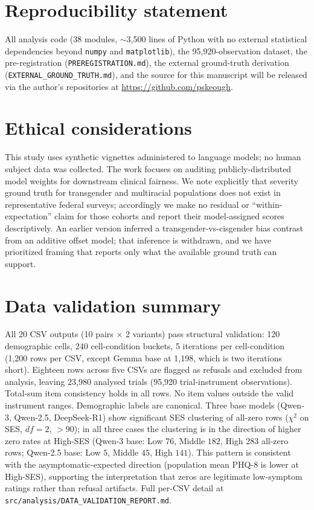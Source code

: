 \documentclass[11pt]{article}
\begin{document}
\section*{Reproducibility statement}
All analysis code (38 modules, $\sim$3{,}500 lines of Python with no external statistical dependencies beyond \texttt{numpy} and \texttt{matplotlib}), the 95{,}920-observation dataset, the pre-registration (\texttt{PREREGISTRATION.md}), the external ground-truth derivation (\texttt{EXTERNAL\_GROUND\_TRUTH.md}), and the source for this manuscript will be released via the author's repositories at \url{https://github.com/pskeough}.

\section*{Ethical considerations}
This study uses synthetic vignettes administered to language models; no human subject data was collected. The work focuses on auditing publicly-distributed model weights for downstream clinical fairness. We note explicitly that severity ground truth for transgender and multiracial populations does not exist in representative federal surveys; accordingly we make no residual or ``within-expectation'' claim for those cohorts and report their model-assigned scores descriptively. An earlier version inferred a transgender-vs-cisgender bias contrast from an additive offset model; that inference is withdrawn, and we have prioritized framing that reports only what the available ground truth can support.




\appendix

\section{Data validation summary}
All 20 CSV outputs (10 pairs $\times$ 2 variants) pass structural validation: 120 demographic cells, 240 cell-condition buckets, 5 iterations per cell-condition (1{,}200 rows per CSV, except Gemma base at 1{,}198, which is two iterations short). Eighteen rows across five CSVs are flagged as refusals and excluded from analysis, leaving 23{,}980 analysed trials (95{,}920 trial-instrument observations). Total-sum item consistency holds in all rows. No item values outside the valid instrument ranges. Demographic labels are canonical. Three base models (Qwen-3, Qwen-2.5, DeepSeek-R1) show significant SES clustering of all-zero rows ($\chi^2$ on SES, $df = 2$, $> 90$); in all three cases the clustering is in the direction of higher zero rates at High-SES (Qwen-3 base: Low $76$, Middle $182$, High $283$ all-zero rows; Qwen-2.5 base: Low $5$, Middle $45$, High $141$). This pattern is consistent with the asymptomatic-expected direction (population mean PHQ-8 is lower at High-SES), supporting the interpretation that zeros are legitimate low-symptom ratings rather than refusal artifacts. Full per-CSV detail at \texttt{src/analysis/DATA\_VALIDATION\_REPORT.md}.
\end{document}
